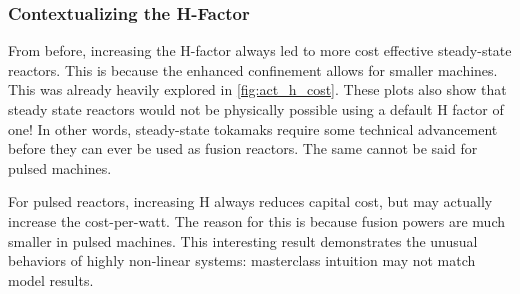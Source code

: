 \subsubsection{Contextualizing the H-Factor}

From before, increasing the H-factor always led to more cost effective steady-state reactors. This is because the enhanced confinement allows for smaller machines. This was already heavily explored in \cref{fig:act_h_cost}. These plots also show that steady state reactors would not be physically possible using a default H factor of one! In other words, steady-state tokamaks require some technical advancement before they can ever be used as fusion reactors. The same cannot be said for pulsed machines.

For pulsed reactors, increasing H always reduces capital cost, but may actually increase the cost-per-watt. The reason for this is because fusion powers are much smaller in pulsed machines. This interesting result demonstrates the unusual behaviors of highly non-linear systems: masterclass intuition may not match model results.

